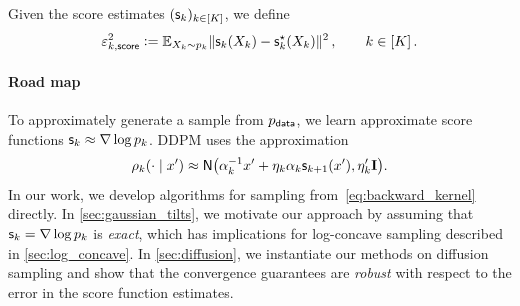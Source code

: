 \begin{definition}\label{def:score-error}
Given the score estimates $(\scf_k)_{k\in [K]}$, we define
\begin{align}\notag
    \epssct[k]^2\ldef \En_{X_k\sim p_k}\nrm{\scf_k(X_k)-\scfs_k(X_k)}^2\,, \qquad k\in[K]\,.
\end{align}
\end{definition}

\paragraph{Road map}
To approximately generate a sample from $\pdata$, we learn approximate score functions $\scf_k\approx \nabla \log p_k$.
DDPM uses the approximation 
\begin{align}\label{eq:DDPM-approx}
    \rho_k(\cdot\mid x') \approx \normal{\alpha_k^{-1} x' + \eta_k \alpha_k \scf_{k+1}(x'), \eta_k' \Id}.
\end{align}
In our work, we develop algorithms for sampling from~\eqref{eq:backward_kernel} directly. In \cref{sec:gaussian_tilts}, we motivate our approach by assuming that $\scf_k=\nabla \log p_k$ is \emph{exact}, which has implications for log-concave sampling described in \cref{sec:log_concave}. In \cref{sec:diffusion}, we instantiate our methods on diffusion sampling and show that the convergence guarantees are \emph{robust} with respect to the error in the score function estimates.




